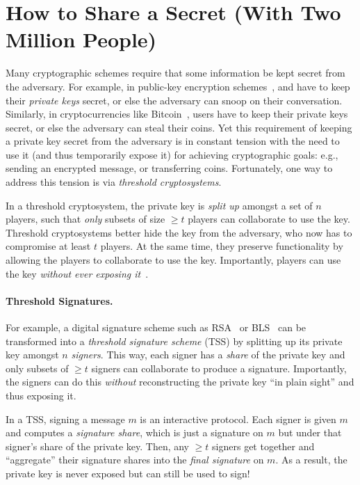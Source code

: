 \section{How to Share a Secret (With Two Million People)}
Many cryptographic schemes require that some information be kept secret from the adversary.
For example, in public-key encryption schemes~\cite{rsa,DH76}, \alice and \bob have to keep their \textit{private keys} secret, or else the adversary can snoop on their conversation.
Similarly, in cryptocurrencies like Bitcoin~\cite{bitcoin}, users have to keep their private keys secret, or else the adversary can steal their coins.
Yet this requirement of keeping a private key secret from the adversary is in constant tension with the need to use it (and thus temporarily expose it) for achieving cryptographic goals: e.g., sending an encrypted message, or transferring coins.
Fortunately, one way to address this tension is via \textit{threshold cryptosystems}.

In a threshold cryptosystem, the private key is \textit{split up} amongst a set of $n$ players, such that \textit{only} subsets of size $\ge t$ players can collaborate to use the key.
Threshold cryptosystems better hide the key from the adversary, who now has to compromise at least $t$ players.
At the same time, they preserve functionality by allowing the players to collaborate to use the key.
Importantly, players can use the key \textit{without ever exposing it}~\cite{Desmedt87,DF90,DesmedtFrankel1992SharedGeneration}.

\paragraph{Threshold Signatures.}
For example, a digital signature scheme such as RSA~\cite{rsa} or BLS~\cite{BLS04} can be transformed into a \textit{threshold signature scheme} (TSS) by splitting up its private key amongst $n$ \textit{signers}.
This way, each signer has a \textit{share} of the private key and only subsets of $\ge t$ signers can collaborate to produce a signature.
Importantly, the signers can do this \textit{without} reconstructing the private key ``in plain sight'' and thus exposing it.

In a TSS, signing a message $m$ is an interactive protocol.
Each signer is given $m$ and computes a \textit{signature share}, which is just a signature on $m$ but under that signer's share of the private key.
Then, any $\ge t$ signers get together and ``aggregate'' their signature shares into the \textit{final signature} on $m$.
As a result, the private key is never exposed but can still be used to sign!

